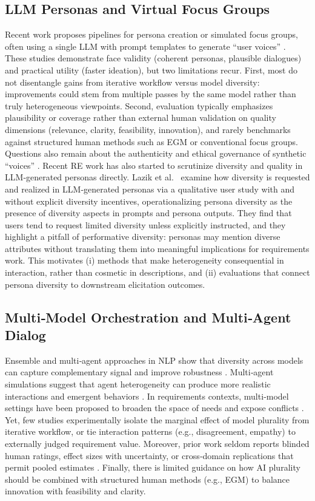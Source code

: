 \documentclass[acmsmall]{acmart}
\begin{document}
\subsection{LLM Personas and Virtual Focus Groups}
Recent work proposes pipelines for persona creation or simulated focus groups, often using a single LLM with prompt templates to generate “user voices” \cite{wu2025personas,liu2024personaflow,zhang2024focus}. These studies demonstrate face validity (coherent personas, plausible dialogues) and practical utility (faster ideation), but two limitations recur. First, most do not disentangle gains from iterative workflow versus model diversity: improvements could stem from multiple passes by the same model rather than truly heterogeneous viewpoints. Second, evaluation typically emphasizes plausibility or coverage rather than external human validation on quality dimensions (relevance, clarity, feasibility, innovation), and rarely benchmarks against structured human methods such as EGM or conventional focus groups. Questions also remain about the authenticity and ethical governance of synthetic “voices” \cite{hulman2023chatgpt,bano2023ai}. Recent RE work has also started to scrutinize diversity and quality in LLM‑generated personas directly. Lazik et al.~\cite{lazik2025good} examine how diversity is requested and realized in LLM‑generated personas via a qualitative user study with and without explicit diversity incentives, operationalizing persona diversity as the presence of diversity aspects in prompts and persona outputs. They find that users tend to request limited diversity unless explicitly instructed, and they highlight a pitfall of performative diversity: personas may mention diverse attributes without translating them into meaningful implications for requirements work. This motivates (i) methods that make heterogeneity consequential in interaction, rather than cosmetic in descriptions, and (ii) evaluations that connect persona diversity to downstream elicitation outcomes.
\subsection{Multi‑Model Orchestration and Multi‑Agent Dialog}
Ensemble and multi‑agent approaches in NLP show that diversity across models can capture complementary signal and improve robustness \cite{yang2025large,deiner2024large}. Multi‑agent simulations suggest that agent heterogeneity can produce more realistic interactions and emergent behaviors \cite{park2023generative,hulman2023chatgpt}. In requirements contexts, multi‑model settings have been proposed to broaden the space of needs and expose conflicts \cite{gorer2024gpt,khan2025large,marques2024using}. Yet, few studies experimentally isolate the marginal effect of model plurality from iterative workflow, or tie interaction patterns (e.g., disagreement, empathy) to externally judged requirement value. Moreover, prior work seldom reports blinded human ratings, effect sizes with uncertainty, or cross‑domain replications that permit pooled estimates \cite{bano2023ai}. Finally, there is limited guidance on how AI plurality should be combined with structured human methods (e.g., EGM) to balance innovation with feasibility and clarity.
\end{document}
